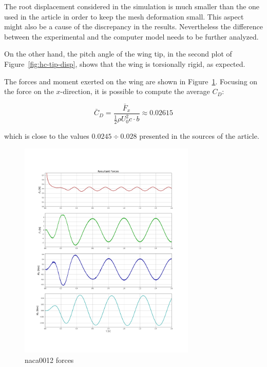 The root displacement considered in the simulation is much smaller than the one used in the article in order to keep the mesh deformation small. This aspect might also be a cause of the discrepancy in the results.
Nevertheless the difference between the experimental and the computer model needs to be further analyzed.

On the other hand, the pitch angle of the wing tip, in the second plot of Figure~\ref{fig:hc-tip-disp}, shows that the wing is torsionally rigid, as expected.

The forces and moment exerted on the wing are shown in Figure~\ref{fig:hc-wing-forces}. Focusing on the force on the $x$-direction, it is possible to compute the  average $C_D$:

\begin{equation}
 \bar{C}_D  = \frac{\bar{F}_x}{\frac{1}{2} \rho U_0^2 c\cdot b} \approx 0.02615   
\end{equation}

which is close to the values $0.0245\div0.028$ presented in the sources of the article.

\begin{figure}[htbp!]
	\centering
	\includegraphics[width=0.75\textwidth, trim=0 150 0 150, clip]{images/heathcote/forces_naca0012.png}
	\caption{naca0012 forces}
	\label{fig:hc-wing-forces}
\end{figure}



